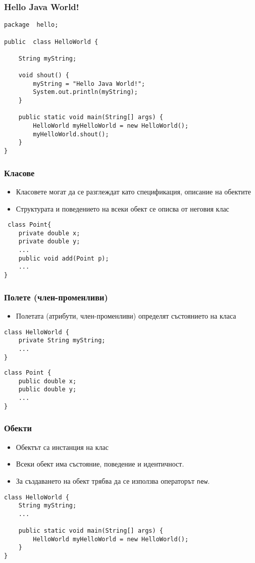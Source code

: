 \documentclass[ignorenonframetext, hyperref=unicode,unicode]{beamer}
\begin{document}
\begin{frame}[containsverbatim]
\frametitle{Hello Java World!}
 \begin{lstlisting}
package  hello;

public  class HelloWorld {

 	String myString;

 	void shout() {
 		myString = "Hello Java World!";
 		System.out.println(myString);
	}

 	public static void main(String[] args) {
 		HelloWorld myHelloWorld = new HelloWorld();
		myHelloWorld.shout();
	}
}
\end{lstlisting}
\end{frame}

\begin{frame}[containsverbatim]
\frametitle{Класове}
 \begin{itemize}
 \item Класовете могат да се разглеждат като спецификация, описание на обектите
\item Структурата и поведението на всеки обект се описва от неговия клас
\end{itemize}
\begin{lstlisting}
 class Point{
	private double x;
	private double y;
	...
	public void add(Point p);
	...
}
\end{lstlisting}
\end{frame}


\begin{frame}[containsverbatim]
\frametitle{Полете (член-променливи)}
 \begin{itemize}
 \item Полетата (атрибути, член-променливи) определят състоянието на класа
\end{itemize}
\begin{lstlisting}
class HelloWorld {
	private String myString;
	...
}
\end{lstlisting}
\begin{lstlisting}
class Point {
	public double x;
	public double y;
	...
}
\end{lstlisting}
\end{frame}


\begin{frame}[containsverbatim]
\frametitle{Обекти}
 \begin{itemize}
 \item Обектът са инстанция на клас
 \item Всеки обект има състояние, поведение и идентичност.
 \item За създаването на обект трябва да се използва операторът \lstinline{new}.
\end{itemize}
\begin{lstlisting}
class HelloWorld {
	String myString;
	...

	public static void main(String[] args) {
 		HelloWorld myHelloWorld = new HelloWorld();
	}
}
\end{lstlisting}
\end{frame}
\end{document}
